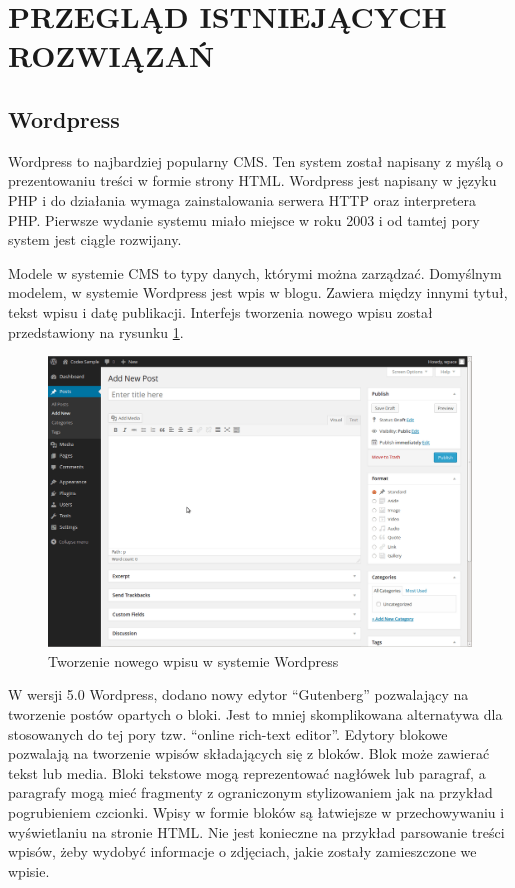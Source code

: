 \section{PRZEGLĄD ISTNIEJĄCYCH ROZWIĄZAŃ}

\subsection{Wordpress}

Wordpress to najbardziej popularny CMS. Ten system został napisany z myślą o
prezentowaniu treści w formie strony HTML. Wordpress jest napisany w języku PHP
i do działania wymaga zainstalowania serwera HTTP oraz interpretera PHP.
Pierwsze wydanie systemu miało miejsce w roku 2003 i od tamtej pory system jest
ciągle rozwijany.

Modele w systemie CMS to typy danych, którymi można zarządzać. Domyślnym
modelem, w systemie Wordpress jest wpis w blogu. Zawiera między innymi tytuł,
tekst wpisu i datę publikacji. Interfejs tworzenia nowego wpisu został
przedstawiony na rysunku \ref{wordpressNewPost}.

\begin{figure}[h]
    \centering
    \includegraphics[width=1\textwidth]{./img/wordpress_new_post.png}
    \caption{Tworzenie nowego wpisu w systemie Wordpress}
    \label{wordpressNewPost}
\end{figure}

W wersji 5.0 Wordpress, dodano nowy edytor ``Gutenberg'' pozwalający na
tworzenie postów opartych o bloki. Jest to mniej skomplikowana alternatywa dla
stosowanych do tej pory tzw. ``online rich-text editor''. Edytory blokowe
pozwalają na tworzenie wpisów składających się z bloków. Blok może zawierać
tekst lub media. Bloki tekstowe mogą reprezentować nagłówek lub paragraf, a
paragrafy mogą mieć fragmenty z ograniczonym stylizowaniem jak na przykład
pogrubieniem czcionki. Wpisy w formie bloków są łatwiejsze w przechowywaniu i
wyświetlaniu na stronie HTML. Nie jest konieczne na przykład parsowanie treści
wpisów, żeby wydobyć informacje o zdjęciach, jakie zostały zamieszczone we
wpisie.

